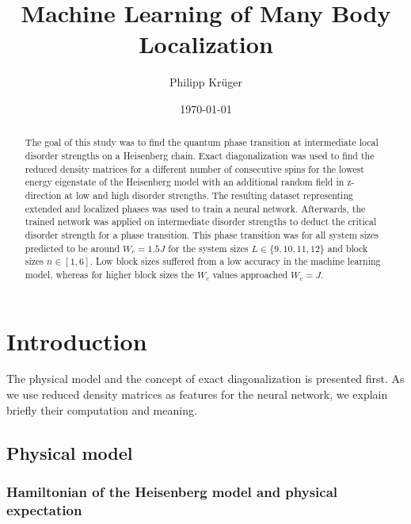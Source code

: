 \documentclass[reprint,amsmath,amssymb,aps,prb]{revtex4-2}
\begin{document}
%

\title{Machine Learning of Many Body Localization}

\author{Philipp Krüger}

\date{\today}%

\begin{abstract}
The goal of this study was to find the quantum phase transition at intermediate local disorder strengths on a Heisenberg chain. Exact diagonalization was used to find the reduced density matrices for a different number of consecutive spins for the lowest energy eigenstate of the Heisenberg model with an additional random field in z-direction at low and high disorder strengths. The resulting dataset representing extended and localized phases was used to train a neural network. Afterwards, the trained network was applied on intermediate disorder strengths to deduct the critical disorder strength for a phase transition. This phase transition was for all system sizes predicted to be around $W_c = 1.5 J$ for the system sizes $L\in\{9, 10, 11, 12\}$ and block sizes $n\in\left[1,6\right]$. Low block sizes suffered from a low accuracy in the machine learning model, whereas for higher block sizes the $W_c$ values approached $W_c=J$.  %
\end{abstract}

\maketitle

\section{Introduction}

The physical model and the concept of exact diagonalization is presented first. As we use reduced density matrices as features for the neural network, we explain briefly their computation and meaning.
\subsection{Physical model}

\subsubsection{Hamiltonian of the Heisenberg model and physical expectation}
\end{document}
